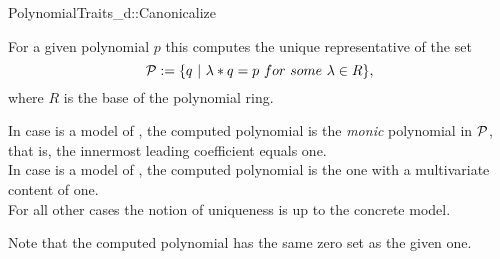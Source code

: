 \begin{ccRefConcept}{PolynomialTraits_d::Canonicalize}

\ccDefinition

For a given polynomial $p$ this  computes the 
unique representative of the set 
\[{\cal P} := \{ q\ |\ \lambda * q = p\ for\ some\ \lambda \in R  \},\]
where $R$ is the base of the polynomial ring. 

In case  is a model of 
, the computed polynomial is the {\em monic} polynomial in 
{$\cal P$}, that is, the innermost leading coefficient equals one.\\
In case  is a model 
of , the computed polynomial is the one with 
a multivariate content of one.\\
For all other cases the notion of uniqueness is up to the concrete model. 

Note that the computed polynomial has the same zero set as the given one.



\ccRefines 

\\
\\
\\

\ccTypes


\ccGlue
{}

\ccOperations





\ccSeeAlso

\\
\\

\end{ccRefConcept}